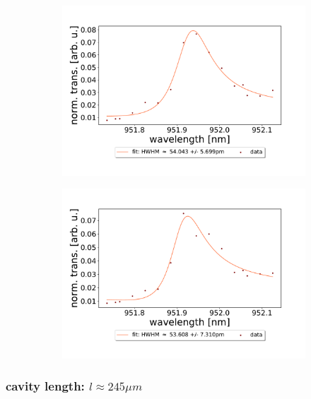 \begin{figure}[h!]
\begin{subfigure}[b]{0.49\textwidth}
        \includegraphics[width=\textwidth]{figures/results/double fano fits/20250326/323um_M3:M5_fit_5.pdf}
        \caption{}
        \label{fig:323um_M3:M5_fit_5}
    \end{subfigure}
    \begin{subfigure}[b]{0.49\textwidth}
        \includegraphics[width=\textwidth]{figures/results/double fano fits/20250326/323um_M3:M5_fit_6.pdf}
        \caption{}
        \label{fig:323um_M3:M5_fit_6}
    \end{subfigure}
\end{figure}

\clearpage
\subsubsection*{cavity length: $l \approx 245 \mu m$}

